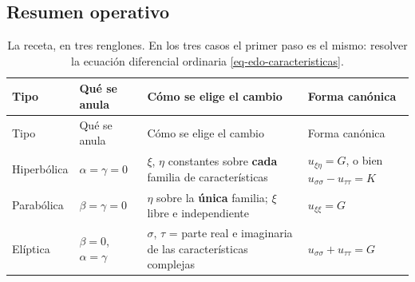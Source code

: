 \documentclass[
  spanish,
  a4paper,
]{scrbook}
\theoremstyle{definition}
\theoremstyle{plain}
\theoremstyle{definition}
\theoremstyle{plain}
\theoremstyle{definition}
\theoremstyle{remark}
\begin{document}
\subsection{Resumen operativo}\label{sec-receta-canonica}

\begin{longtable}[]{@{}
  >{\raggedright\arraybackslash}p{}
  >{\raggedright\arraybackslash}p{}
  >{\raggedright\arraybackslash}p{}
  >{\raggedright\arraybackslash}p{}@{}}
\caption{La receta, en tres renglones. En los tres casos el primer paso
es el mismo: resolver la ecuación diferencial ordinaria
\ref{eq-edo-caracteristicas}.}\label{tbl-canonicas}\tabularnewline
\toprule\noalign{}
\begin{minipage}[b]{\linewidth}\raggedright
Tipo
\end{minipage} & \begin{minipage}[b]{\linewidth}\raggedright
Qué se anula
\end{minipage} & \begin{minipage}[b]{\linewidth}\raggedright
Cómo se elige el cambio
\end{minipage} & \begin{minipage}[b]{\linewidth}\raggedright
Forma canónica
\end{minipage} \\
\midrule\noalign{}
\endfirsthead
\toprule\noalign{}
\begin{minipage}[b]{\linewidth}\raggedright
Tipo
\end{minipage} & \begin{minipage}[b]{\linewidth}\raggedright
Qué se anula
\end{minipage} & \begin{minipage}[b]{\linewidth}\raggedright
Cómo se elige el cambio
\end{minipage} & \begin{minipage}[b]{\linewidth}\raggedright
Forma canónica
\end{minipage} \\
\midrule\noalign{}
\endhead
\bottomrule\noalign{}
\endlastfoot
Hiperbólica & \(\alpha = \gamma = 0\) & \(\xi\), \(\eta\) constantes
sobre \textbf{cada} familia de características & \(u_{\xi\eta} = G\), o
bien \(u_{\sigma\sigma}-u_{\tau\tau}=K\) \\
Parabólica & \(\beta = \gamma = 0\) & \(\eta\) sobre la \textbf{única}
familia; \(\xi\) libre e independiente & \(u_{\xi\xi} = G\) \\
Elíptica & \(\beta = 0\), \(\alpha=\gamma\) & \(\sigma\), \(\tau\) =
parte real e imaginaria de las características complejas &
\(u_{\sigma\sigma}+u_{\tau\tau}=G\) \\
\end{longtable}
\end{document}
